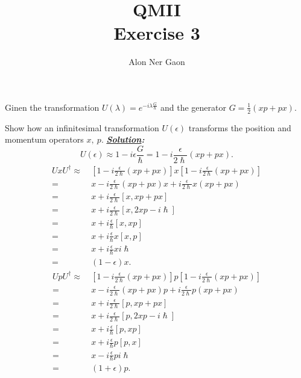 \documentclass[notitlepage]{report}
\title{\Huge{QMII}\\Exercise 3}
\author{Alon Ner Gaon}
\begin{document}
\maketitle
\begin{question}[title = Question 1]{}{}
Ginen the transformation $U\left(\lambda\right)=e^{-i\lambda \frac{G}{\hslash}} $ and the generator $G=\frac{1}{2}\left(xp+px\right) $.
\end{question}
\begin{question}[title = Part 1]{}{}
Show how an infinitesimal transformation $U\left(\epsilon\right) $ transforms the position and momentum operators $x,\ p$. 
\tcblower
\textbf{\emph{\underline{Solution}:}}\\
\[
	U\left(\epsilon\right)\approx 1-i\epsilon \frac{G}{\hslash}=1-i \frac{\epsilon}{2\hslash}\left(xp+px\right) 
.\] 
\begin{align*}
	UxU^{\dag}\approx&\ \left[1-i \frac{\epsilon}{2\hslash}\left(xp+px\right)\right]x\left[1-i \frac{\epsilon}{2\hslash}\left(xp+px\right)\right]\\
	 =&\ x-i \frac{\epsilon}{2\hslash}\left(xp+px\right)x+i \frac{\epsilon}{2\hslash}x\left(xp+px\right)\\
	  =&\ x + i \frac{\epsilon}{2\hslash}\left[x,xp+px\right]\\
	  =&\ x + i \frac{\epsilon}{2\hslash}\left[x,2xp-i\hslash\right]\\
	  =&\ x + i \frac{\epsilon}{\hslash}\left[x,xp\right]\\
	  =&\ x + i \frac{\epsilon}{\hslash}x\left[x,p\right]\\
	  =&\ x + i \frac{\epsilon}{\hslash}xi\hslash\\
		=&\ \boxed{\left(1-\epsilon\right)x}
.\end{align*}
\tcbbreak
\begin{align*}
	UpU^{\dag}\approx&\ \left[1-i \frac{\epsilon}{2\hslash}\left(xp+px\right)\right]p\left[1-i \frac{\epsilon}{2\hslash}\left(xp+px\right)\right]\\
	 =&\ x-i \frac{\epsilon}{2\hslash}\left(xp+px\right)p+i \frac{\epsilon}{2\hslash}p\left(xp+px\right)\\
	  =&\ x + i \frac{\epsilon}{2\hslash}\left[p,xp+px\right]\\
	  =&\ x + i \frac{\epsilon}{2\hslash}\left[p,2xp-i\hslash\right]\\
	  =&\ x + i \frac{\epsilon}{\hslash}\left[p,xp\right]\\
	  =&\ x + i \frac{\epsilon}{\hslash}p\left[p,x\right]\\
	  =&\ x - i \frac{\epsilon}{\hslash}pi\hslash\\
		=&\ \boxed{\left(1+\epsilon\right)p}
.\end{align*}
\end{question}
\end{document}

